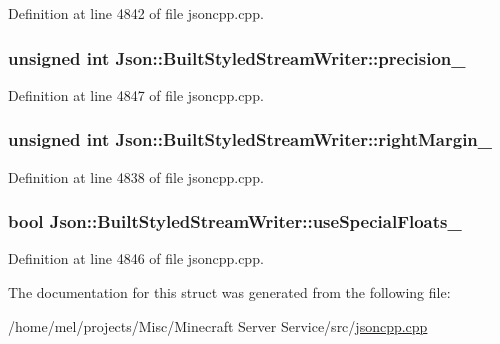 Definition at line 4842 of file jsoncpp.\+cpp.

\subsubsection[{\texorpdfstring{precision\+\_\+}{precision_}}]{\setlength{\rightskip}{0pt plus 5cm}unsigned int Json\+::\+Built\+Styled\+Stream\+Writer\+::precision\+\_\+\hspace{0.3cm}{\ttfamily [private]}}\hypertarget{struct_json_1_1_built_styled_stream_writer_a6373d8d0ae4741b64e3904e4db0eef46}{}\label{struct_json_1_1_built_styled_stream_writer_a6373d8d0ae4741b64e3904e4db0eef46}


Definition at line 4847 of file jsoncpp.\+cpp.

\subsubsection[{\texorpdfstring{right\+Margin\+\_\+}{rightMargin_}}]{\setlength{\rightskip}{0pt plus 5cm}unsigned int Json\+::\+Built\+Styled\+Stream\+Writer\+::right\+Margin\+\_\+\hspace{0.3cm}{\ttfamily [private]}}\hypertarget{struct_json_1_1_built_styled_stream_writer_a06a51521ccae20397f52fe3036edc602}{}\label{struct_json_1_1_built_styled_stream_writer_a06a51521ccae20397f52fe3036edc602}


Definition at line 4838 of file jsoncpp.\+cpp.

\subsubsection[{\texorpdfstring{use\+Special\+Floats\+\_\+}{useSpecialFloats_}}]{\setlength{\rightskip}{0pt plus 5cm}bool Json\+::\+Built\+Styled\+Stream\+Writer\+::use\+Special\+Floats\+\_\+\hspace{0.3cm}{\ttfamily [private]}}\hypertarget{struct_json_1_1_built_styled_stream_writer_a6f1b8694b4eb17ab8c34f6d6dd8c8a4a}{}\label{struct_json_1_1_built_styled_stream_writer_a6f1b8694b4eb17ab8c34f6d6dd8c8a4a}


Definition at line 4846 of file jsoncpp.\+cpp.



The documentation for this struct was generated from the following file\+:\begin{DoxyCompactItemize}
\item 
/home/mel/projects/\+Misc/\+Minecraft Server Service/src/\hyperlink{jsoncpp_8cpp}{jsoncpp.\+cpp}\end{DoxyCompactItemize}
